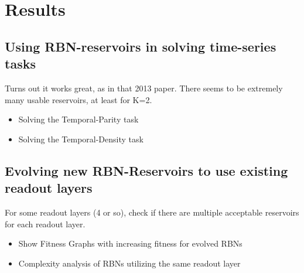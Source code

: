 \section{Results}

\begin{figure}
  \resizebox{\columnwidth}{!}{
    \subfloat[100-3]{
      
    }
    \subfloat[100-5]{
      
    }
  }

  \resizebox{\columnwidth}{!}{
    \subfloat[200-3]{
      
    }
    \subfloat[200-5]{
      
    }
  }
\end{figure}

\begin{figure}
  \resizebox{\columnwidth}{!}{
    \subfloat[200-3]{
      
    }
    \subfloat[200-5]{
      
    }
  }
\end{figure}

\subsection{Using RBN-reservoirs in solving time-series tasks}

Turns out it works great, as in that 2013 paper.
There seems to be extremely many usable reservoirs, at least for K=2.

\begin{itemize}
  \item Solving the Temporal-Parity task
  \item Solving the Temporal-Density task
\end{itemize}

\subsection{Evolving new RBN-Reservoirs to use existing readout layers}

For some readout layers (4 or so), check if there are multiple acceptable reservoirs for each readout layer.

\begin{itemize}
  \item Show Fitness Graphs with increasing fitness for evolved RBNs
  \item Complexity analysis of RBNs utilizing the same readout layer
\end{itemize}

